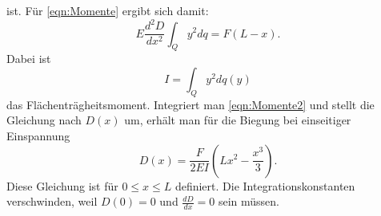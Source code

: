 ist. Für \eqref{eqn:Momente} ergibt sich damit:
\begin{equation}
E \frac{d^2D}{dx^2} \int_{Q} y^2 dq = F(L-x).
\label{eqn:Momente2}
\end{equation}
Dabei ist
\begin{equation*}
I = \int_{Q} y^2 dq(y)
\end{equation*}
das Flächenträgheitsmoment.
Integriert man \eqref{eqn:Momente2} und stellt die Gleichung
nach $D(x)$ um, erhält man für die Biegung bei einseitiger Einspannung
\begin{equation}
D(x) = \frac{F}{2EI} (Lx^2- \frac{x^3}{3}).
\label{eqn:D1}
\end{equation}
Diese Gleichung ist für $0 \leq x \leq L$ definiert.
Die Integrationskonstanten verschwinden, weil $D(0) = 0$ und $\frac{dD}{dx} = 0$ sein müssen.

